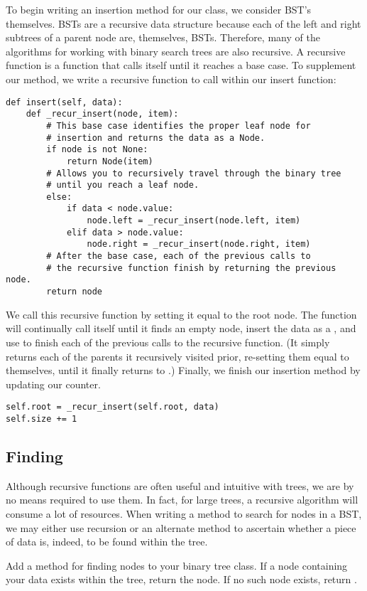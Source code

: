 To begin writing an insertion method for our  class, we consider BST's themselves.
BSTs are a recursive data structure because each of the left and right subtrees of a parent node are, themselves, BSTs.
Therefore, many of the algorithms for working with binary search trees are also recursive.
A recursive function is a function that calls itself until it reaches a base case.
To supplement our  method, we write a recursive function to call within our insert function:
\begin{lstlisting}
def insert(self, data):
    def _recur_insert(node, item):
        # This base case identifies the proper leaf node for
        # insertion and returns the data as a Node.
        if node is not None:
            return Node(item)
        # Allows you to recursively travel through the binary tree
        # until you reach a leaf node.
        else:
            if data < node.value:
                node.left = _recur_insert(node.left, item)
            elif data > node.value:
                node.right = _recur_insert(node.right, item)
        # After the base case, each of the previous calls to
        # the recursive function finish by returning the previous node.
        return node
\end{lstlisting}
We call this recursive function by setting it equal to the root node.
The function will continually call itself until it finds an empty node, insert the data as a , and use  to finish each of the previous calls to the recursive function. (It simply returns each of the parents it recursively visited prior, re-setting them equal to themselves, until it finally returns to .)
Finally, we finish our insertion method by updating our counter.
\begin{lstlisting}
self.root = _recur_insert(self.root, data)
self.size += 1
\end{lstlisting}


\subsection*{Finding}
Although recursive functions are often useful and intuitive with trees, we  are by no means required to use them.
In fact, for large trees, a recursive algorithm will consume a lot of resources.
When writing a method to search for nodes in a BST, we may either use recursion or an alternate method to ascertain whether a piece of data is, indeed, to be found within the tree.

\begin{problem}
Add a method for finding nodes to your binary tree class. If a node containing your data exists within the tree, return the node.
If no such node exists, return .
\label{Finding Nodes}
\end{problem}

